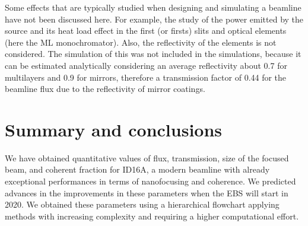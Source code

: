 \documentclass{iucr}              %
\newcommand{\todo}[1]{{\color{red}[TODO: "#1'']}}
\begin{document}
Some effects that are typically studied when designing and simulating a beamline have not been discussed here. For example, the study of the power emitted by the source and its heat load effect in the first (or firsts) slits and optical elements (here the ML monochromator). Also, the reflectivity of the elements is not considered. The simulation of this was not included in the simulations, because it can be estimated analytically considering an average reflectivity about 0.7 for multilayers and 0.9 for mirrors, therefore a transmission factor of 0.44 for the beamline flux due to the reflectivity of mirror coatings. 


\section{Summary and conclusions}
\label{summary}

We have obtained quantitative values of flux, transmission, size of the focused beam, and coherent fraction for ID16A, a modern beamline with already exceptional performances in terms of nanofocusing and coherence. We predicted advances in the improvements in these parameters when the EBS will start in 2020. We obtained these parameters using a hierarchical flowchart applying methods with increasing complexity and requiring a higher computational effort. 
\end{document}
